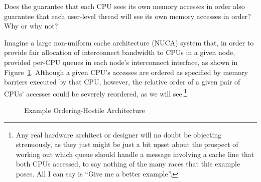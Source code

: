 \QuickQuiz{}
	Does the guarantee that each CPU sees its own memory accesses
	in order also guarantee that each user-level thread will see
	its own memory accesses in order?
	Why or why not?
 \QuickQuizEnd

Imagine a large non-uniform cache architecture (NUCA) system that,
in order to provide fair allocation
of interconnect bandwidth to CPUs in a given node, provided per-CPU
queues in each node's interconnect interface, as shown in
Figure~\ref{fig:app:whymb:Example Ordering-Hostile Architecture}.
Although a given CPU's accesses are ordered as specified by memory
barriers executed by that CPU, however, the relative order of a
given pair of CPUs' accesses could be severely reordered,
as we will see.\footnote{
	Any real hardware architect or designer will no doubt be
	objecting strenuously,
	as they just might be just a bit upset about the prospect of working
	out which queue should handle a message involving a cache line
	that both CPUs accessed, to say nothing of the many races that
	this example poses.
	All I can say is ``Give me a better example''.}

\begin{figure}[htb]
\begin{center}
\end{center}
\caption{Example Ordering-Hostile Architecture}
\label{fig:app:whymb:Example Ordering-Hostile Architecture}
\end{figure}

